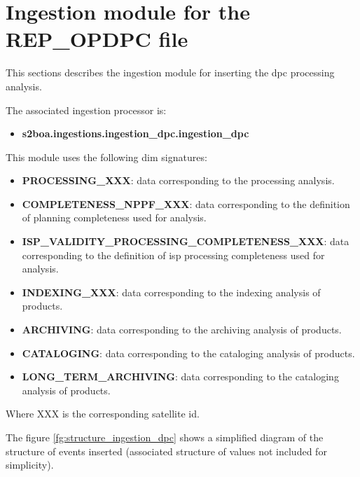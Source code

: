 \section{Ingestion module for the REP\_OPDPC file}

This sections describes the ingestion module for inserting the \acrshort{dpc} processing analysis.

The associated ingestion processor is:

\begin{itemize} 

\item \textbf{s2boa.ingestions.ingestion\_dpc.ingestion\_dpc}
  
\end{itemize}

This module uses the following \acrshort{dim} signatures:

\begin{itemize} 

\item \textbf{PROCESSING\_XXX}: data corresponding to the processing analysis.

\item \textbf{COMPLETENESS\_NPPF\_XXX}: data corresponding to the definition of planning completeness used for analysis.

\item \textbf{ISP\_VALIDITY\_PROCESSING\_COMPLETENESS\_XXX}: data corresponding to the definition of \acrshort{isp} processing completeness used for analysis.

\item \textbf{INDEXING\_XXX}: data corresponding to the indexing analysis of products.

\item \textbf{ARCHIVING}: data corresponding to the archiving analysis of products.

\item \textbf{CATALOGING}: data corresponding to the cataloging analysis of products.

\item \textbf{LONG\_TERM\_ARCHIVING}: data corresponding to the cataloging analysis of products.

\end{itemize}

Where XXX is the corresponding satellite id.

The figure \ref{fg:structure_ingestion_dpc} shows a simplified diagram of the structure of events inserted (associated structure of values not included for simplicity).

